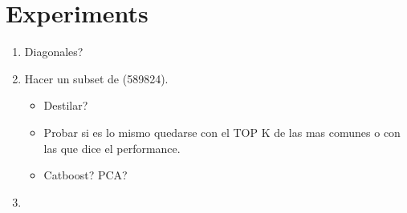 \section{Experiments}

\begin{enumerate}
\item Diagonales?
\item Hacer un subset de  (589824).
\begin{itemize}
\item Destilar?
\item Probar si es lo mismo quedarse con el TOP K de las mas comunes o con las que dice el performance.
\item Catboost? PCA?
\end{itemize}
\item 
\end{enumerate}
